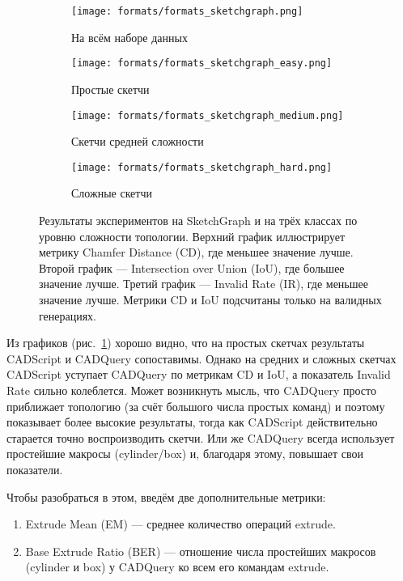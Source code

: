 \begin{figure}[h!]
    \centering
    \begin{subfigure}{0.45\linewidth}
        \centering
        \texttt{[image: formats/formats\_sketchgraph.png]}
        \caption{На всём наборе данных}
    \end{subfigure}
    \hfill
    \begin{subfigure}{0.45\linewidth}
        \centering
        \texttt{[image: formats/formats\_sketchgraph\_easy.png]}
        \caption{Простые скетчи}
    \end{subfigure}

    \vspace{1em}

    \begin{subfigure}{0.45\linewidth}
        \centering
        \texttt{[image: formats/formats\_sketchgraph\_medium.png]}
        \caption{Скетчи средней сложности}
    \end{subfigure}
    \hfill
    \begin{subfigure}{0.45\linewidth}
        \centering
        \texttt{[image: formats/formats\_sketchgraph\_hard.png]}
        \caption{Сложные скетчи}
    \end{subfigure}

    \caption{Результаты экспериментов на SketchGraph и на трёх классах по уровню сложности топологии.
        Верхний график иллюстрирует метрику Chamfer Distance (CD), где меньшее значение лучше.
        Второй график --- Intersection over Union (IoU), где большее значение лучше.
        Третий график --- Invalid Rate (IR), где меньшее значение лучше.
        Метрики CD и IoU подсчитаны только на валидных генерациях.}
    \label{fig:exp2}
\end{figure}

Из графиков (рис.~\ref{fig:exp2}) хорошо видно, что на простых скетчах результаты CADScript и CADQuery сопоставимы. Однако на средних и сложных скетчах CADScript уступает CADQuery по метрикам CD и IoU, а показатель Invalid Rate сильно колеблется. Может возникнуть мысль, что CADQuery просто приближает топологию (за счёт большого числа простых команд) и поэтому показывает более высокие результаты, тогда как CADScript действительно старается точно воспроизводить скетчи. Или же CADQuery всегда использует простейшие макросы (cylinder/box) и, благодаря этому, повышает свои показатели.

Чтобы разобраться в этом, введём две дополнительные метрики:
\begin{enumerate}
    \item Extrude Mean (EM) --- среднее количество операций extrude.
    \item Base Extrude Ratio (BER) --- отношение числа простейших макросов (cylinder и
          box) у CADQuery ко всем его командам extrude.
\end{enumerate}

